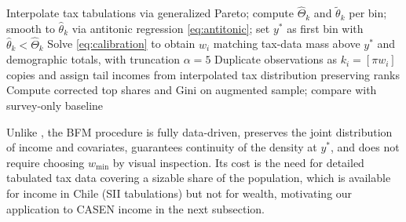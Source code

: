 \begin{algorithm}[H]
    \caption{Blanchet-Flores-Morgan (2022) Correction Procedure}\label{alg:bfm}
    \SetAlgoLined
    \BlankLine
    Interpolate tax tabulations via generalized Pareto; compute $\hat{\Theta}_{k}$ and $\tilde{\theta}_{k}$ per bin; smooth to $\hat{\theta}_{k}$ via antitonic regression \eqref{eq:antitonic}; set $y^{*}$ as first bin with $\hat{\theta}_{k} < \hat{\Theta}_{k}$\;
    \BlankLine
    Solve \eqref{eq:calibration} to obtain $w_{i}$ matching tax-data mass above $y^{*}$ and demographic totals, with truncation $\alpha=5$\;
    \BlankLine
    Duplicate observations as $k_{i}=[\pi w_{i}]$ copies and assign tail incomes from interpolated tax distribution preserving ranks\;
    \BlankLine
    Compute corrected top shares and Gini on augmented sample; compare with survey-only baseline\;
\end{algorithm}

Unlike \citet{vermeulen2018}, the BFM procedure is fully data-driven, preserves the joint distribution of income and covariates, guarantees continuity of the density at $y^{*}$, and does not require choosing $w_{\min}$ by visual inspection. Its cost is the need for detailed tabulated tax data covering a sizable share of the population, which is available for income in Chile (SII tabulations) but not for wealth, motivating our application to CASEN income in the next subsection.


